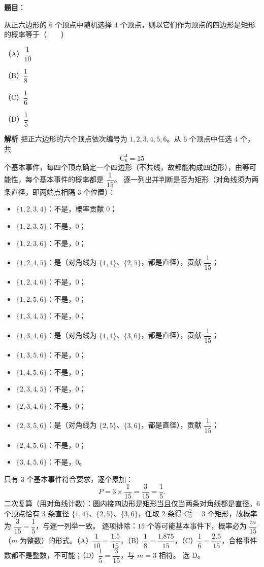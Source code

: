 \begin{answer}

\textbf{题目}：

从正六边形的 6 个顶点中随机选择 4 个顶点，则以它们作为顶点的四边形是矩形的概率等于\mbox{（　　）}

（A）$\dfrac1{10}$

（B）$\dfrac18$

（C）$\dfrac16$

（D）$\dfrac15$

\textbf{解析}
把正六边形的六个顶点依次编号为 $1,2,3,4,5,6$。从 $6$ 个顶点中任选 $4$ 个，共
\nopagebreak[4]
\[
\mathrm C_6^4=15
\]
个基本事件，每四个顶点确定一个四边形（不共线，故都能构成四边形），由等可能性，每个基本事件的概率都是 $\dfrac1{15}$。
逐一列出并判断是否为矩形（对角线须为两条直径，即两端点相隔 $3$ 个位置）：
\begin{itemize}
\item $\{1,2,3,4\}$：不是，概率贡献 $0$；
\item $\{1,2,3,5\}$：不是，$0$；
\item $\{1,2,3,6\}$：不是，$0$；
\item $\{1,2,4,5\}$：是（对角线为 $\{1,4\}$、$\{2,5\}$，都是直径），贡献 $\dfrac1{15}$；
\item $\{1,2,4,6\}$：不是，$0$；
\item $\{1,2,5,6\}$：不是，$0$；
\item $\{1,3,4,5\}$：不是，$0$；
\item $\{1,3,4,6\}$：是（对角线为 $\{1,4\}$、$\{3,6\}$，都是直径），贡献 $\dfrac1{15}$；
\item $\{1,3,5,6\}$：不是，$0$；
\item $\{1,4,5,6\}$：不是，$0$；
\item $\{2,3,4,5\}$：不是，$0$；
\item $\{2,3,4,6\}$：不是，$0$；
\item $\{2,3,5,6\}$：是（对角线为 $\{2,5\}$、$\{3,6\}$，都是直径），贡献 $\dfrac1{15}$；
\item $\{2,4,5,6\}$：不是，$0$；
\item $\{3,4,5,6\}$：不是，$0$。
\end{itemize}
只有 $3$ 个基本事件符合要求，逐个累加：
\nopagebreak[4]
\[
P=3\times\frac{1}{15}=\frac{3}{15}=\frac15.
\]
二次复算（用对角线计数）：圆内接四边形是矩形当且仅当两条对角线都是直径。$6$ 个顶点恰有 $3$ 条直径 $\{1,4\}$、$\{2,5\}$、$\{3,6\}$，任取 $2$ 条得 $\mathrm C_3^2=3$ 个矩形，故概率为 $\dfrac{3}{15}=\dfrac15$，与逐一列举一致。
逐项排除：$15$ 个等可能基本事件下，概率必为 $\dfrac{m}{15}$（$m$ 为整数）的形式。（A）$\dfrac{1}{10}=\dfrac{1.5}{15}$，（B）$\dfrac18=\dfrac{1.875}{15}$，（C）$\dfrac16=\dfrac{2.5}{15}$，合格事件数都不是整数，不可能；（D）$\dfrac15=\dfrac{3}{15}$，与 $m=3$ 相符。
选 D。


\end{answer}
